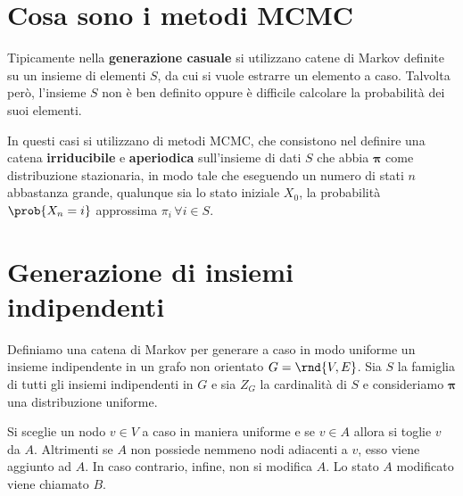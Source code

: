 \documentclass[\main/main.tex]{subfiles}
\begin{document}
\section{Cosa sono i metodi MCMC}
Tipicamente nella \textbf{generazione casuale} si utilizzano catene di Markov definite su un insieme di elementi \(S\), da cui si vuole estrarre un elemento a caso. Talvolta però, l'insieme \(S\) non è ben definito oppure è difficile calcolare la probabilità dei suoi elementi.

In questi casi si utilizzano di metodi MCMC, che consistono nel definire una catena \textbf{irriducibile} e \textbf{aperiodica} sull'insieme di dati \(S\) che abbia \(\bm{\pi} \) come distribuzione stazionaria, in modo tale che eseguendo un numero di stati \(n\) abbastanza grande, qualunque sia lo stato iniziale \(X_0\), la probabilità \(\prob{X_n=i}\) approssima \(\pi_i\, \forall i \in S\).

\section{Generazione di insiemi indipendenti}
Definiamo una catena di Markov per generare a caso in modo uniforme un insieme indipendente in un grafo non orientato \(G = \rnd{V, E}\). Sia \(S\) la famiglia di tutti gli insiemi indipendenti in \(G\) e sia \(Z_G\) la cardinalità di \(S\) e consideriamo \(\bm{\pi} \) una distribuzione uniforme.

Si sceglie un nodo \(v \in V\) a caso in maniera uniforme e se \(v \in A\) allora si toglie \(v\) da \(A\). Altrimenti se \(A\) non possiede nemmeno nodi adiacenti a \(v\), esso viene aggiunto ad \(A\). In caso contrario, infine, non si modifica \(A\). Lo stato \(A\) modificato viene chiamato \(B\).
\end{document}
